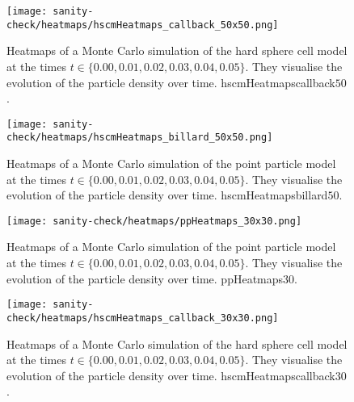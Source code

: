 \begin{figure}[h]
	\centering
    \texttt{[image: sanity-check/heatmaps/hscmHeatmaps\_callback\_50x50.png]}
    \caption{Heatmaps of a Monte Carlo simulation of the hard sphere cell model at the times $t \in \{0.00, 0.01, 0.02, 0.03, 0.04, 0.05\}$. 
    They visualise the evolution of the particle density over time. 
    hscmHeatmapscallback$50$.
    }
\end{figure}


\begin{figure}[h]
	\centering
    \texttt{[image: sanity-check/heatmaps/hscmHeatmaps\_billard\_50x50.png]}
    \caption{Heatmaps of a Monte Carlo simulation of the point particle model at the times $t \in \{0.00, 0.01, 0.02, 0.03, 0.04, 0.05\}$. 
    They visualise the evolution of the particle density over time. 
    hscmHeatmapsbillard$50$.
    }
\end{figure}




\begin{figure}[h]
	\centering
    \texttt{[image: sanity-check/heatmaps/ppHeatmaps\_30x30.png]}
    \caption{Heatmaps of a Monte Carlo simulation of the point particle model at the times $t \in \{0.00, 0.01, 0.02, 0.03, 0.04, 0.05\}$. 
    They visualise the evolution of the particle density over time. 
    ppHeatmaps$30$. 
    }
\end{figure}

\begin{figure}[h]
	\centering
    \texttt{[image: sanity-check/heatmaps/hscmHeatmaps\_callback\_30x30.png]}
    \caption{Heatmaps of a Monte Carlo simulation of the hard sphere cell model at the times $t \in \{0.00, 0.01, 0.02, 0.03, 0.04, 0.05\}$. 
    They visualise the evolution of the particle density over time. 
    hscmHeatmapscallback$30$.
    }
\end{figure}


